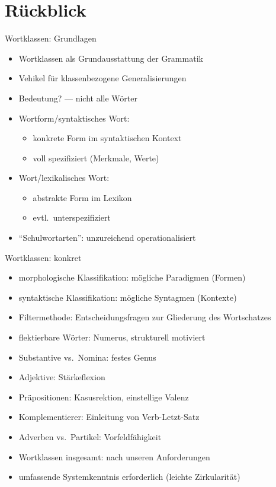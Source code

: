 
\section{Rückblick}

\begin{frame}
  {Wortklassen: Grundlagen}
  \pause
  \begin{itemize}[<+->]
    \item Wortklassen als \alert{Grundausstattung der Grammatik}
    \item Vehikel für klassenbezogene Generalisierungen
    \item Bedeutung? --- nicht alle Wörter
      \Zeile
    \item Wortform\slash syntaktisches Wort:
      \begin{itemize}[<+->]
        \item konkrete Form \alert{im syntaktischen Kontext}
        \item voll spezifiziert (Merkmale, Werte)
      \end{itemize}
      \Zeile
    \item Wort\slash lexikalisches Wort:
      \begin{itemize}[<+->]
        \item abstrakte Form \alert{im Lexikon}
        \item evtl.\ unterspezifiziert
      \end{itemize}
      \Zeile
    \item "`Schulwortarten"': \alert{unzureichend operationalisiert}
  \end{itemize}
\end{frame}

\begin{frame}
  {Wortklassen: konkret}
  \pause
  \begin{itemize}[<+->]
    \item morphologische Klassifikation: mögliche Paradigmen (Formen)
    \item syntaktische Klassifikation: mögliche Syntagmen (Kontexte)
     \Halbzeile 
    \item \alert{Filtermethode}: Entscheidungsfragen zur Gliederung des Wortschatzes
      \Halbzeile
    \item flektierbare Wörter: Numerus, \alert{strukturell motiviert}
    \item Substantive vs.\ Nomina: festes Genus
    \item Adjektive: Stärkeflexion
    \item Präpositionen: Kasusrektion, einstellige Valenz
    \item Komplementierer: Einleitung von Verb-Letzt-Satz
    \item Adverben vs.\ Partikel: Vorfeldfähigkeit
      \Halbzeile
    \item Wortklassen insgesamt: \alert{nach unseren Anforderungen}
    \item umfassende Systemkenntnis erforderlich (leichte Zirkularität)
  \end{itemize}
\end{frame}

